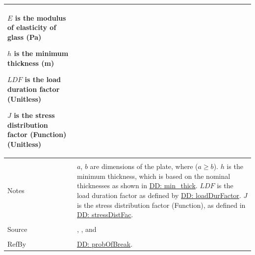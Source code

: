 \documentclass[12pt]{article}
\begin{document}
\begin{minipage}{\textwidth}
\begin{tabular}{p{} p{}}
\begin{symbDescription}
                                                  \item{$E$ is the modulus of elasticity of glass (Pa)}
                                                  \item{$h$ is the minimum thickness (m)}
                                                  \item{$LDF$ is the load duration factor (Unitless)}
                                                  \item{$J$ is the stress distribution factor (Function) (Unitless)}
                                                  \end{symbDescription}
                                                  \\ \midrule \\
                                                  Notes & $a$, $b$ are dimensions of the plate, where ($a\geq{}b$).
                                                          $h$ is the minimum thickness, which is based on the nominal thicknesses as shown in \hyperref[DD:min.thick]{DD: min\_thick}.
                                                          $LDF$ is the load duration factor as defined by \hyperref[DD:loadDurFactor]{DD: loadDurFactor}.
                                                          $J$ is the stress distribution factor (Function), as defined in \hyperref[DD:stressDistFac]{DD: stressDistFac}.
                                                          \\ \midrule \\
                                                          Source & \cite{astm2009}, \cite{beasonEtAl1998}, and \cite{campidelli}
                                                                   \\ \midrule \\
                                                                   RefBy & \hyperref[DD:probOfBreak]{DD: probOfBreak}.
\\ \bottomrule \end{tabular}
\end{minipage}
\par~
\end{document}
